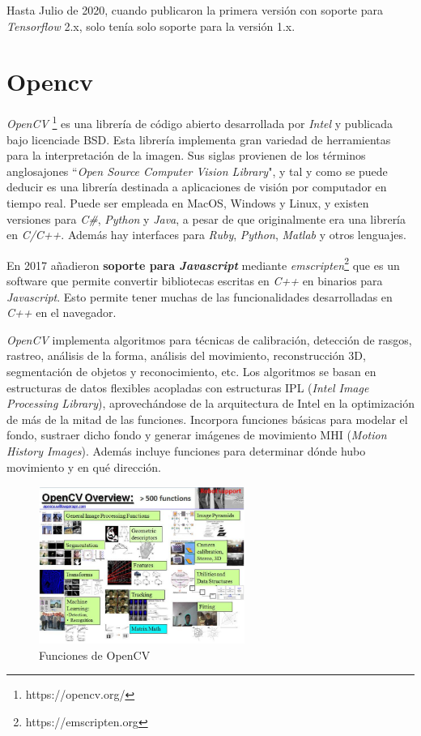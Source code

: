 Hasta Julio de 2020, cuando publicaron la primera versión con soporte para \textit{Tensorflow} 2.x, solo tenía solo soporte para la versión 1.x.

\section{Opencv}
\textit{OpenCV} \footnote{https://opencv.org/} es una librería de código abierto desarrollada por \textit{Intel} y publicada  bajo licenciade BSD. Esta librería implementa gran variedad de herramientas para la interpretación de la imagen. Sus  siglas  provienen  de  los  términos anglosajones ``\textit{Open Source Computer  Vision Library}", y tal y como se puede deducir es una librería destinada a aplicaciones de visión por computador en tiempo real. Puede ser empleada en MacOS, Windows y Linux, y existen versiones para \textit{C\#}, \textit{Python} y \textit{Java}, a pesar de que originalmente era una librería en \textit{C/C++}. Además hay interfaces para \textit{Ruby}, \textit{Python}, \textit{Matlab} y otros lenguajes.

En 2017 añadieron \textbf{soporte para \textit{Javascript}} mediante \textit{emscripten}\footnote{https://emscripten.org} que es un software que permite convertir bibliotecas escritas en \textit{C++} en binarios para \textit{Javascript}. Esto permite tener muchas de las funcionalidades desarrolladas en \textit{C++} en el navegador.

\textit{OpenCV} implementa algoritmos para técnicas de calibración, detección de rasgos, rastreo, análisis de la forma, análisis del movimiento, reconstrucción 3D, segmentación de objetos y reconocimiento, etc. Los algoritmos se basan  en  estructuras de datos flexibles acopladas con estructuras IPL (\textit{Intel  Image Processing Library}), aprovechándose de la arquitectura de Intel en la optimización de más de la mitad de las funciones. Incorpora funciones básicas para modelar el fondo, sustraer dicho  fondo y generar imágenes de movimiento MHI  (\textit{Motion  History  Images}).  Además  incluye  funciones para determinar dónde hubo movimiento y en qué dirección. 

\begin{figure}[H]
  \begin{center}
    \includegraphics[width=0.6\textwidth]{figures/herramientas/opencv.png}
		\caption{Funciones de OpenCV}
		\label{fig.opencv}
		\end{center}
\end{figure}

